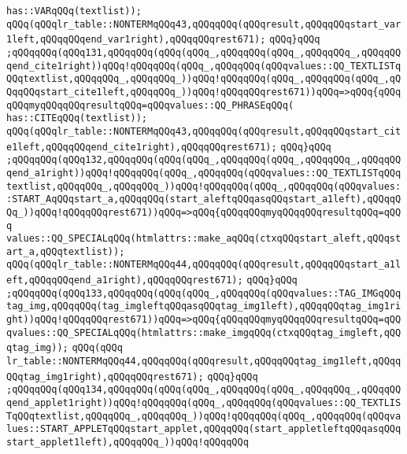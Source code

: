\verb|has::VARqQQq(textlist));|\newline
\verb|qQQq(qQQqlr_table::NONTERMqQQq43,qQQqqQQq(qQQqresult,qQQqqQQqstart_var1left,qQQqqQQqend_var1right),qQQqqQQqrest671);|\newline
\verb|qQQq}qQQq|\newline
\verb|;qQQqqQQq(qQQq131,qQQqqQQq(qQQq(qQQq_,qQQqqQQq(qQQq_,qQQqqQQq_,qQQqqQQqend_cite1right))qQQq!qQQqqQQq(qQQq_,qQQqqQQq(qQQqvalues::QQ_TEXTLISTqQQqtextlist,qQQqqQQq_,qQQqqQQq_))qQQq!qQQqqQQq(qQQq_,qQQqqQQq(qQQq_,qQQqqQQqstart_cite1left,qQQqqQQq_))qQQq!qQQqqQQqrest671))qQQq=>qQQq{qQQqqQQqmyqQQqqQQqresultqQQq=qQQqvalues::QQ_PHRASEqQQq(|\newline
\verb|has::CITEqQQq(textlist));|\newline
\verb|qQQq(qQQqlr_table::NONTERMqQQq43,qQQqqQQq(qQQqresult,qQQqqQQqstart_cite1left,qQQqqQQqend_cite1right),qQQqqQQqrest671);|\newline
\verb|qQQq}qQQq|\newline
\verb|;qQQqqQQq(qQQq132,qQQqqQQq(qQQq(qQQq_,qQQqqQQq(qQQq_,qQQqqQQq_,qQQqqQQqend_a1right))qQQq!qQQqqQQq(qQQq_,qQQqqQQq(qQQqvalues::QQ_TEXTLISTqQQqtextlist,qQQqqQQq_,qQQqqQQq_))qQQq!qQQqqQQq(qQQq_,qQQqqQQq(qQQqvalues::START_AqQQqstart_a,qQQqqQQq(start_aleftqQQqasqQQqstart_a1left),qQQqqQQq_))qQQq!qQQqqQQqrest671))qQQq=>qQQq{qQQqqQQqmyqQQqqQQqresultqQQq=qQQq|\newline
\verb|values::QQ_SPECIALqQQq(htmlattrs::make_aqQQq(ctxqQQqstart_aleft,qQQqstart_a,qQQqtextlist));|\newline
\verb|qQQq(qQQqlr_table::NONTERMqQQq44,qQQqqQQq(qQQqresult,qQQqqQQqstart_a1left,qQQqqQQqend_a1right),qQQqqQQqrest671);|\newline
\verb|qQQq}qQQq|\newline
\verb|;qQQqqQQq(qQQq133,qQQqqQQq(qQQq(qQQq_,qQQqqQQq(qQQqvalues::TAG_IMGqQQqtag_img,qQQqqQQq(tag_imgleftqQQqasqQQqtag_img1left),qQQqqQQqtag_img1right))qQQq!qQQqqQQqrest671))qQQq=>qQQq{qQQqqQQqmyqQQqqQQqresultqQQq=qQQqvalues::QQ_SPECIALqQQq(htmlattrs::make_imgqQQq(ctxqQQqtag_imgleft,qQQqtag_img));|\newline
\verb|qQQq(qQQq|\newline
\verb|lr_table::NONTERMqQQq44,qQQqqQQq(qQQqresult,qQQqqQQqtag_img1left,qQQqqQQqtag_img1right),qQQqqQQqrest671);|\newline
\verb|qQQq}qQQq|\newline
\verb|;qQQqqQQq(qQQq134,qQQqqQQq(qQQq(qQQq_,qQQqqQQq(qQQq_,qQQqqQQq_,qQQqqQQqend_applet1right))qQQq!qQQqqQQq(qQQq_,qQQqqQQq(qQQqvalues::QQ_TEXTLISTqQQqtextlist,qQQqqQQq_,qQQqqQQq_))qQQq!qQQqqQQq(qQQq_,qQQqqQQq(qQQqvalues::START_APPLETqQQqstart_applet,qQQqqQQq(start_appletleftqQQqasqQQqstart_applet1left),qQQqqQQq_))qQQq!qQQqqQQq|\newline
